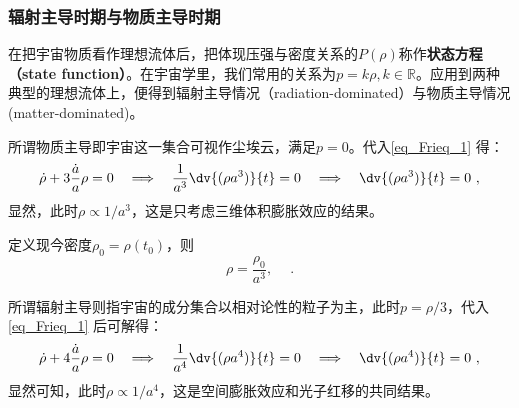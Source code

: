 \subsubsection{辐射主导时期与物质主导时期}
在把宇宙物质看作理想流体后，把体现压强与密度关系的$P(\rho)$称作\textbf{状态方程（state function）}。在宇宙学里，我们常用的关系为$p=k\rho,k\in \mathbb R$。应用到两种典型的理想流体上，便得到辐射主导情况（radiation-dominated）与物质主导情况(matter-dominated)。

所谓物质主导即宇宙这一集合可视作尘埃云，满足$p=0$。代入\autoref{eq_Frieq_1} 得：
\begin{equation}\dot{\rho}+3\frac{\dot{a}}{a}\rho=0\quad\Longrightarrow\quad\frac1{a^3}\dv{(\rho a^3)}{t}=0\quad\Longrightarrow\quad\dv{(\rho a^3)}{t}=0 ~,\end{equation}
显然，此时$\rho\propto 1/a^3$，这是只考虑三维体积膨胀效应的结果。

定义现今密度$\rho_0=\rho(t_0)$，则
\begin{equation}
\rho=\frac{\rho_0}{a^3},\quad ~.
\end{equation}

所谓辐射主导则指宇宙的成分集合以相对论性的粒子为主，此时$p=\rho/3$，代入\autoref{eq_Frieq_1} 后可解得：
\begin{equation}\dot{\rho}+4\frac{\dot{a}}{a}\rho=0\quad\Longrightarrow\quad\frac1{a^4}\dv{(\rho a^4)}{t}=0\quad\Longrightarrow\quad\dv{(\rho a^4)}{t} =0~,\end{equation}
显然可知，此时$\rho\propto  1/a^4$，这是空间膨胀效应和光子红移的共同结果。
